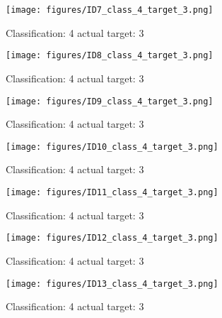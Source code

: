 \begin{figure}[h!]
\begin{center}
\texttt{[image: figures/ID7\_class\_4\_target\_3.png]}
\end{center}
\caption{ Classification: 4 actual target: 3}
\label{fig:ID7_class_4_target_3}
\end{figure}
\begin{figure}[h!]
\begin{center}
\texttt{[image: figures/ID8\_class\_4\_target\_3.png]}
\end{center}
\caption{ Classification: 4 actual target: 3}
\label{fig:ID8_class_4_target_3}
\end{figure}
\begin{figure}[h!]
\begin{center}
\texttt{[image: figures/ID9\_class\_4\_target\_3.png]}
\end{center}
\caption{ Classification: 4 actual target: 3}
\label{fig:ID9_class_4_target_3}
\end{figure}
\begin{figure}[h!]
\begin{center}
\texttt{[image: figures/ID10\_class\_4\_target\_3.png]}
\end{center}
\caption{ Classification: 4 actual target: 3}
\label{fig:ID10_class_4_target_3}
\end{figure}
\begin{figure}[h!]
\begin{center}
\texttt{[image: figures/ID11\_class\_4\_target\_3.png]}
\end{center}
\caption{ Classification: 4 actual target: 3}
\label{fig:ID11_class_4_target_3}
\end{figure}
\begin{figure}[h!]
\begin{center}
\texttt{[image: figures/ID12\_class\_4\_target\_3.png]}
\end{center}
\caption{ Classification: 4 actual target: 3}
\label{fig:ID12_class_4_target_3}
\end{figure}
\begin{figure}[h!]
\begin{center}
\texttt{[image: figures/ID13\_class\_4\_target\_3.png]}
\end{center}
\caption{ Classification: 4 actual target: 3}
\label{fig:ID13_class_4_target_3}
\end{figure}
